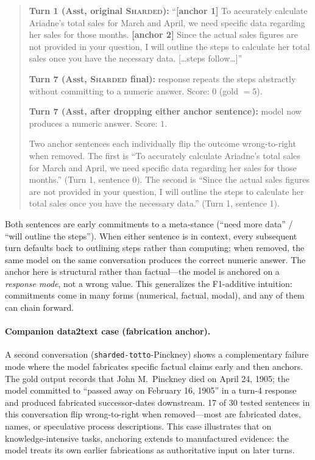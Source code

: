 \documentclass{article}
\begin{document}
\begin{quote}
\small
\textbf{Turn 1 (Asst, original \textsc{Sharded}):} ``\textbf{[anchor 1]} To accurately calculate Ariadne's total sales for March and April, we need specific data regarding her sales for those months. \textbf{[anchor 2]} Since the actual sales figures are not provided in your question, I will outline the steps to calculate her total sales once you have the necessary data. [\ldots steps follow\ldots]''

\textbf{Turn 7 (Asst, \textsc{Sharded} final):} response repeats the steps abstractly without committing to a numeric answer. Score: $0$ (gold $= 5$).

\textbf{Turn 7 (Asst, after dropping either anchor sentence):} model now produces a numeric answer. Score: $1$.

Two anchor sentences each individually flip the outcome wrong-to-right when removed. The first is ``To accurately calculate Ariadne's total sales for March and April, we need specific data regarding her sales for those months.'' (Turn 1, sentence 0). The second is ``Since the actual sales figures are not provided in your question, I will outline the steps to calculate her total sales once you have the necessary data.'' (Turn 1, sentence 1).
\end{quote}

\smallskip\noindent Both sentences are early commitments to a meta-stance (``need more data'' / ``will outline the steps''). When either sentence is in context, every subsequent turn defaults back to outlining steps rather than computing; when removed, the same model on the same conversation produces the correct numeric answer. The anchor here is structural rather than factual---the model is anchored on a \emph{response mode}, not a wrong value. This generalizes the F1-additive intuition: commitments come in many forms (numerical, factual, modal), and any of them can chain forward.

\paragraph{Companion data2text case (fabrication anchor).}
A second conversation (\texttt{sharded-totto}-Pinckney) shows a complementary failure mode where the model fabricates specific factual claims early and then anchors. The gold output records that John M.\ Pinckney died on April 24, 1905; the model committed to ``passed away on February 16, 1905'' in a turn-4 response and produced fabricated successor-dates downstream. 17 of 30 tested sentences in this conversation flip wrong-to-right when removed---most are fabricated dates, names, or speculative process descriptions. This case illustrates that on knowledge-intensive tasks, anchoring extends to manufactured evidence: the model treats its own earlier fabrications as authoritative input on later turns.
\end{document}
